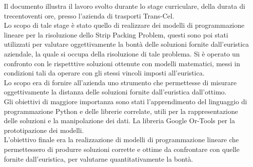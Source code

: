 
Il documento illustra il lavoro svolto durante lo stage curriculare, della durata di trecentoventi ore, presso l’azienda di trasporti Trans-Cel.\\
Lo scopo di tale stage è stato quello di realizzare dei modelli di programmazione lineare per la risoluzione dello Strip Packing Problem, questi sono poi stati utilizzati per valutare oggettivamente la bontà delle soluzioni fornite dall'euristica aziendale, la quale si occupa della risoluzione di tale problema.
Si è operato un confronto con le rispetttive soluzioni ottenute con modelli matematici, messi in condizioni tali da operare con gli stessi vincoli imposti all'euristica.\\
Lo scopo era di fornire all'azienda uno strumento che permettesse di misurare oggettivamente la distanza delle soluzioni fornite dall'euristica dall'ottimo.\\
\newline
Gli obiettivi di maggiore importanza sono stati l'apprendimento del linguaggio di programmazione Python e delle librerie correlate, utili per la rappresentazione delle soluzioni e la manipolazione dei dati. La libreria Google Or-Tools per la prototipazione dei modelli.\\
L'obiettivo finale era la realizzazione di modelli di programmazione lineare che permettessero di produrre soluzioni corrette e ottime da confrontare con quelle fornite dall'euristica, per valutarne quantitativamente la bontà.